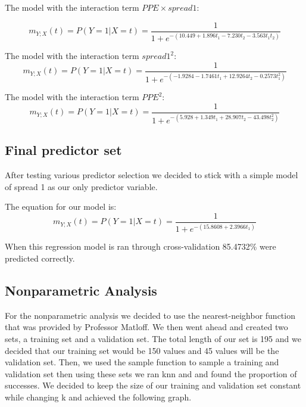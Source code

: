 \documentclass{article}
\begin{document}
The model with the interaction term $PPE \times spread 1$:

\begin{equation}
\label{logit2}
m_{Y;X}(t) = P(Y = 1 | X = t) = \frac{1}{1+e^{-(10.449+1.896
t_1 - 7.230t_2 - 3.563t_1t_2)}}
\end{equation}

The model with the interaction term $spread1^{2}$:
\begin{equation}
\label{logit2}
m_{Y;X}(t) = P(Y = 1 | X = t) = \frac{1}{1+e^{-(-1.9284 - 1.7461
t_1 + 12.9264t_2 - 0.2573t_1^2)}}
\end{equation}

The model with the interaction term $PPE^{2}$:
\begin{equation}
\label{logit2}
m_{Y;X}(t) = P(Y = 1 | X = t) = \frac{1}{1+e^{-(5.928 + 1.349
t_1 + 28.907t_2 - 43.498t_2^2)}}
\end{equation}

\subsection{Final predictor set}

After testing various predictor selection we decided to stick with a
simple model of spread 1 as our only predictor variable.

The equation for our model is:
\begin{equation}
\label{logit2}
m_{Y;X}(t) = P(Y = 1 | X = t) = \frac{1}{1+e^{-(15.8608+2.3966
t_1)}}
\end{equation}

When this regression model is ran through cross-validation 85.4732\%
were predicted correctly.  

\subsection{Nonparametric Analysis}

For the nonparametric analysis we decided to use the nearest-neighbor function
that was provided by Professor Matloff. We then went ahead and created two
sets, a training set and a validation set. The total length of our set is 195
and we decided that our training set would be 150 values and 45 values will be
the validation set. Then, we used the sample function to sample a training and
validation set then using these sets we ran knn and and found the proportion of
successes. We decided to keep the size of our training and validation set
constant while changing k and achieved the following graph.
\end{document}
